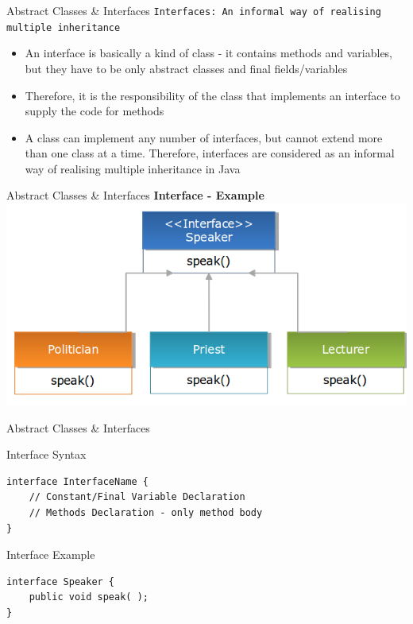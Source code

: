 \documentclass[14pt]{beamer}
\begin{document}
\begin{frame}{Abstract Classes \& Interfaces}
 \texttt{Interfaces: An informal way of realising multiple inheritance}
 
 \begin{itemize}
  \item An interface is basically a kind of class - it contains methods and variables, but they have to be only abstract classes and final fields/variables
  \item Therefore, it is the responsibility of the class that implements an interface to supply the code for methods
  \item A class can implement any number of interfaces, but cannot extend more than one class at a time. Therefore, interfaces are considered as an informal way of realising multiple inheritance in Java
 \end{itemize}
\end{frame}

\begin{frame}{Abstract Classes \& Interfaces}
 \textbf{Interface - Example}
 \includegraphics[scale=.45]{interface-example.png}
\end{frame}

\begin{frame}[fragile]{Abstract Classes \& Interfaces}

 \begin{block}{Interface Syntax}
  \begin{lstlisting}[numbers=none, basicstyle=\tiny]
interface InterfaceName {
    // Constant/Final Variable Declaration
    // Methods Declaration - only method body
}
  \end{lstlisting}

 \end{block}

 \begin{block}{Interface Example}
  \begin{lstlisting}[numbers=none]
interface Speaker {
    public void speak( );
}
  \end{lstlisting}

 \end{block}
\end{frame}
\end{document}
